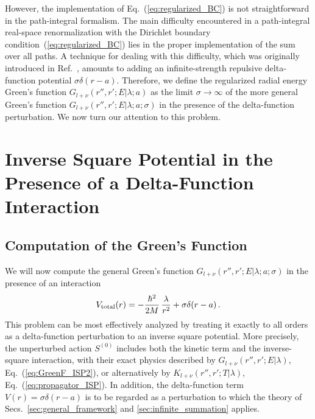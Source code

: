 \documentclass[a4paper,preprint,draft,showpacs,amsmath,amsfonts,amssymb,aps,prd]{revtex4}%
\begin{document}
However, the implementation of
Eq.~(\ref{eq:regularized_BC}) is not straightforward in the path-integral formalism. 
The main difficulty encountered in a path-integral real-space 
renormalization with the Dirichlet 
boundary condition~(\ref{eq:regularized_BC})
lies in the proper implementation of the sum over all paths.
A technique for dealing with this difficulty,
which was originally introduced in 
Ref.~\cite{gro:93}, amounts to adding an infinite-strength
repulsive delta-function potential $\sigma \delta (r-a)$.
Therefore, we define the 
regularized radial energy Green's function 
$G_{l+\nu} (r'', r' ; E| \lambda; a)$
as the limit
$\sigma \rightarrow \infty$ of the 
more general Green's function $G_{l+\nu} (r'', r' ; E| \lambda; a; \sigma)$
in the presence of the delta-function perturbation.
We now turn our attention to this problem.



\section{Inverse Square Potential in the Presence of a  
Delta-Function Interaction}
\label{sec:ISP+delta}


\subsection{Computation of the Green's Function}
\label{sec:ISP+delta_GF_computation}


We will now compute the
general Green's function $G_{l+\nu} (r'', r' ; E| \lambda; a; \sigma)$
in the presence of an interaction
\begin{equation}
V_{\rm total}(r)=
-\frac{ \hbar^{2}}{2M}
 \,  \frac{\lambda}{r^{2}}
+ \sigma \delta (r-a)
\,  .
\label{eq:ISP+delta}
\end{equation}
This problem can be most effectively analyzed by 
treating it exactly to all orders
as a delta-function perturbation 
to an inverse square potential.
More precisely,
the unperturbed action
$S^{(0)}$  includes both the kinetic term and the inverse-square interaction,
with their exact physics described by 
$G_{l+\nu} (r'',r';E| \lambda)$, 
Eq.~(\ref{eq:GreenF_ISP2}),
or alternatively by 
$K_{l+\nu} (r'',r';T | \lambda)$, Eq.~(\ref{eq:propagator_ISP}).
In addition, the 
delta-function term 
$V (r)= \sigma \delta (r-a)$
is to be regarded
as a perturbation to which the theory of Secs.~\ref{sec:general_framework}
and \ref{sec:infinite_summation}
applies.
 
\end{document}
